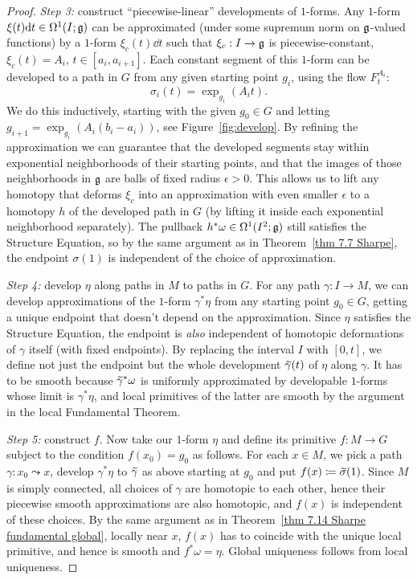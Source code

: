 \begin{proof}
    \emph{Step 3:} construct ``piecewise-linear'' developments of $1$-forms. Any $1$-form $\xi(t){\mathrm{d}} t\in\Omega^1(I;\mathfrak{g})$ can be approximated (under some supremum norm on $\mathfrak{g}$-valued functions) by a $1$-form $\xi_c(t)\dd t$ such that $\xi_c:I\to \mathfrak{g}$ is piecewise-constant, $\xi_c(t)=A_i$, $t\in[a_i,a_{i+1}]$. Each constant segment of this $1$-form can be developed to a path in $G$ from any given starting point $g_i$, using the flow $F^{A_i}_t$:
    \[\sigma_i(t)=\exp_{g_i}(A_i t).\]
    We do this inductively, starting with the given $g_0\in G$ and letting $g_{i+1}=\exp_{g_i}(A_i (b_i-a_i))$, see Figure~\ref{fig:develop}. By refining the approximation we can guarantee that the developed segments stay within exponential neighborhoods of their starting points, and that the images of those neighborhoods in $\mathfrak{g}$ are balls of fixed radius $\epsilon>0$. This allows us to lift any homotopy that deforms $\xi_c$ into an approximation with even smaller $\epsilon$ to a homotopy $h$ of the developed path in $G$ (by lifting it inside each exponential neighborhood separately). The pullback $h^\ast \omega\in \Omega^1(I^2;\mathfrak{g})$ still satisfies the Structure Equation, so by the same argument as in Theorem~\ref{thm 7.7 Sharpe}, the endpoint $\sigma(1)$ is independent of the choice of approximation.

    \emph{Step 4:} develop $\eta$ along paths in $M$ to paths in $G$. For any path $\gamma:I\to M$, we can develop approximations of the $1$-form $\gamma^\ast \eta$ from any starting point $g_0\in G$, getting a unique endpoint that doesn't depend on the approximation. Since $\eta$ satisfies the Structure Equation, the endpoint is \emph{also} independent of homotopic deformations of $\gamma$ itself (with fixed endpoints). By replacing the interval $I$ with $[0,t]$, we define not just the endpoint but the whole development $\wt\gamma(t)$ of $\eta$ along $\gamma$. It has to be smooth because $\wt\gamma^\ast \omega$ is uniformly approximated by developable $1$-forms whose limit is $\gamma^\ast\eta$, and local primitives of the latter are smooth by the argument in the local Fundamental Theorem.

    \emph{Step 5:} construct $f$. Now take our $1$-form $\eta$ and define its primitive $f:M\to G$ subject to the condition $f(x_0)=g_0$ as follows. For each $x\in M$, we pick a path $\gamma:x_0\leadsto x$, develop $\gamma^\ast\eta$ to $\wt\gamma$ as above starting at $g_0$ and put $f(x)\coloneqq \wt\sigma(1)$. Since $M$ is simply connected, all choices of $\gamma$ are homotopic to each other, hence their piecewise smooth approximations are also homotopic, and $f(x)$ is independent of these choices. By the same argument as in Theorem~\ref{thm 7.14 Sharpe fundamental global}, locally near $x$, $f(x)$ has to coincide with the unique local primitive, and hence is smooth and $f^\ast\omega=\eta$. Global uniqueness follows from local uniqueness.
\end{proof}

